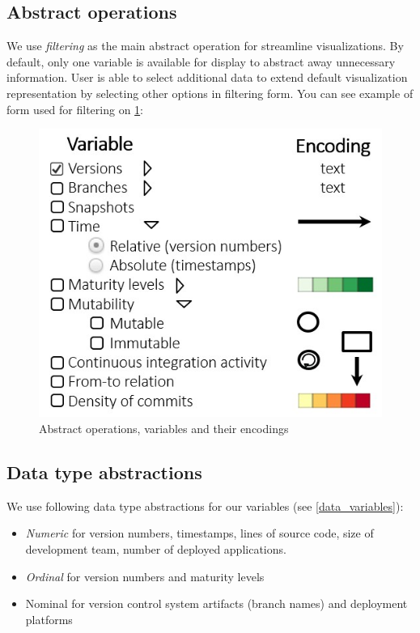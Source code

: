 \documentclass[journal]{vgtc}                %
\begin{document}
\subsection{Abstract operations}
We use \textit{filtering} as the main abstract operation for streamline visualizations. By default, only one variable is available for display to abstract away unnecessary information. User is able to select additional data to extend default visualization representation by selecting other options in filtering form. You can see example of form used for filtering on \ref{abstract_operations}:
\begin{figure}[H]
\includegraphics[scale=0.5]{abstract_operations}
\caption{Abstract operations, variables and their encodings}
\label{abstract_operations}
\end{figure}

\subsection{Data type abstractions}

We use following data type abstractions for our variables (see \ref{data_variables}):
\begin{itemize}[noitemsep,topsep=0pt]
\item \textit{Numeric} for version numbers, timestamps, lines of source code, size of development team, number of deployed applications.
\item \textit{Ordinal} for version numbers and maturity levels
\item Nominal for version control system artifacts (branch names) and deployment platforms
\end{itemize}
\end{document}
